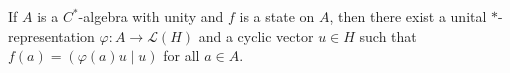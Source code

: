 If $A$ is a $C^*$-algebra with unity and $f$ is a state on $A$, then there exist a unital $*$-representation $\varphi: A \to \mathcal{L}(H)$ and a cyclic vector $u \in H$ such that $f(a) = (\varphi(a)u \mid u)$ for all $a \in A$.
